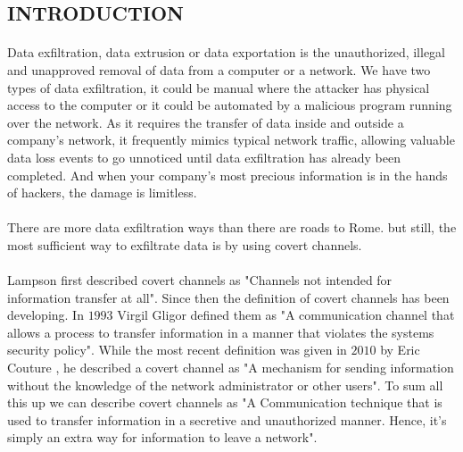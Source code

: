 \documentclass[main.tex]{subfiles}
\begin{document}
\normalsize
\begin{center}\section{INTRODUCTION}\end{center}

\paragraph{}
Data exfiltration, data extrusion or data exportation is the unauthorized, illegal and unapproved removal of data from a computer or a network. We have two types of data exfiltration, it could be manual where the attacker has physical access to the computer or it could be automated by a malicious program running over the network. As it requires the transfer of data inside and outside a company's network, it frequently mimics typical network traffic, allowing valuable data loss events to go unnoticed until data exfiltration has already been completed. And when your company's most precious information is in the hands of hackers, the damage is limitless.\paragraph{}There are more data exfiltration ways than there are roads to Rome. but still, the most sufficient way to exfiltrate data is by using covert channels.
\paragraph{}
Lampson first described covert channels \cite{lampson1973note} as "Channels not intended for information transfer at all". Since then the definition of covert channels has been developing. In $1993$ Virgil Gligor defined them \cite{gligor1993guide} as "A communication channel that allows a process to transfer information in a manner that violates the systems security policy". While the most recent definition was given in $2010$ by Eric Couture \cite{couture2010covert}, he described a covert channel as "A mechanism for sending information without the knowledge of the network administrator or other users". To sum all this up we can describe covert channels as "A Communication technique that is used to transfer information in a secretive and unauthorized manner. Hence, it's simply an extra way for information to leave a network".
\end{document}
